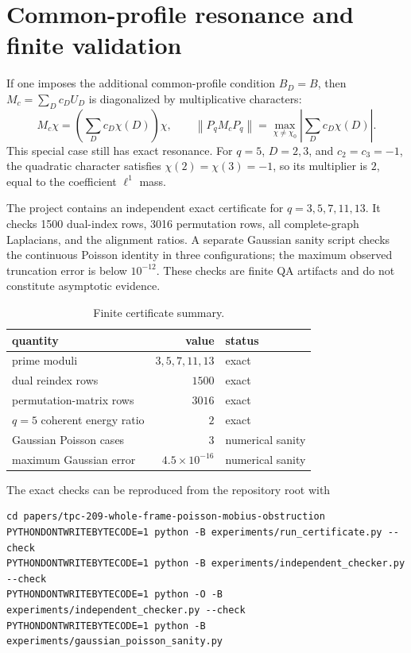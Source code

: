 \documentclass[11pt]{article}
\newcommand{\norm}[1]{\left\lVert #1\right\rVert}
\begin{document}
\section{Common-profile resonance and finite validation}

If one imposes the additional common-profile condition $B_D=B$, then
$M_c=\sum_Dc_DU_D$ is diagonalized by multiplicative characters:
\[
 M_c\chi=\left(\sum_Dc_D\chi(D)\right)\chi,
 \qquad
 \norm{P_qM_cP_q}=\max_{\chi\ne\chi_0}
 \left|\sum_Dc_D\chi(D)\right|.
 \tag{8.1}
\]
This special case still has exact resonance.  For $q=5$, $D=2,3$, and
$c_2=c_3=-1$, the quadratic character satisfies
$\chi(2)=\chi(3)=-1$, so its multiplier is $2$, equal to the coefficient
$\ell^1$ mass.

The project contains an independent exact certificate for
$q=3,5,7,11,13$.  It checks 1500 dual-index rows, 3016 permutation rows, all
complete-graph Laplacians, and the alignment ratios.  A separate Gaussian
sanity script checks the continuous Poisson identity in three configurations;
the maximum observed truncation error is below $10^{-12}$.  These checks are
finite QA artifacts and do not constitute asymptotic evidence.

\begin{table}[t]
\centering
\caption{Finite certificate summary.}
\label{tab:certificate}
\begin{tabular}{@{}lrl@{}}
\toprule
quantity & value & status \\
\midrule
prime moduli & $3,5,7,11,13$ & exact \\
dual reindex rows & $1500$ & exact \\
permutation-matrix rows & $3016$ & exact \\
$q=5$ coherent energy ratio & $2$ & exact \\
Gaussian Poisson cases & $3$ & numerical sanity \\
maximum Gaussian error & $4.5\times10^{-16}$ & numerical sanity \\
\bottomrule
\end{tabular}
\end{table}

The exact checks can be reproduced from the repository root with
\begin{verbatim}
cd papers/tpc-209-whole-frame-poisson-mobius-obstruction
PYTHONDONTWRITEBYTECODE=1 python -B experiments/run_certificate.py --check
PYTHONDONTWRITEBYTECODE=1 python -B experiments/independent_checker.py --check
PYTHONDONTWRITEBYTECODE=1 python -O -B experiments/independent_checker.py --check
PYTHONDONTWRITEBYTECODE=1 python -B experiments/gaussian_poisson_sanity.py
\end{verbatim}
\end{document}
